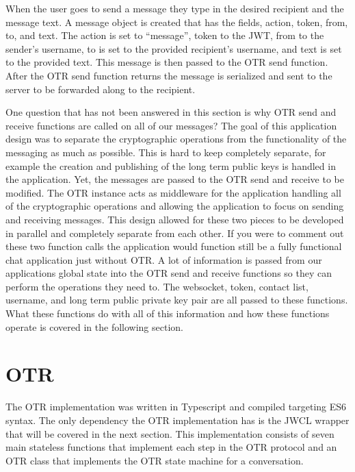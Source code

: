 When the user goes to send a message they type in the desired recipient and the message text.
A message object is created that has the fields, action, token, from, to, and text. The action is set to “message”, token to the JWT, from to the sender's username, to is set to the provided recipient's username, and text is set to the provided text. This message is then passed to the OTR send function. After the OTR send function returns the message is serialized and sent to the server to be forwarded along to the recipient.


One question that has not been answered in this section is why OTR send and receive functions are called on all of our messages? The goal of this application design was to separate the cryptographic operations from the functionality of the messaging as much as possible. This is hard to keep completely separate, for example the creation and publishing of the long term public keys is handled in the application. Yet, the messages are passed to the OTR send and receive to be modified. The OTR instance acts as middleware for the application handling all of the cryptographic operations and allowing the application to focus on sending and receiving messages. This design allowed for these two pieces to be developed in parallel and completely separate from each other. If you were to comment out these two function calls the application would function still be a fully functional chat application just without OTR. A lot of information is passed from our applications global state into the OTR send and receive functions so they can perform the operations they need to. The websocket, token, contact list, username, and long term public private key pair are all passed to these functions. What these functions do with all of this information and how these functions operate is covered in the following section.


\section{OTR}


The OTR implementation was written in Typescript and compiled targeting ES6 syntax. The only dependency the OTR implementation has is the JWCL wrapper that will be covered in the next section. This implementation consists of seven main stateless functions that implement each step in the OTR protocol and an OTR class that implements the OTR state machine for a conversation. 


